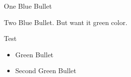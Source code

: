 \documentclass{beamer}
\begin{document}
    \begin{frame}
        \begin{itemize}
            {\item One Blue Bullet}
            \item Two Blue Bullet. But want it green color.

        \end{itemize}

        \begin{exampleblock}{Test}
            \begin{itemize}
                \item Green Bullet
                \item Second Green Bullet
            \end{itemize}
        \end{exampleblock}

    \end{frame}
\end{document}

